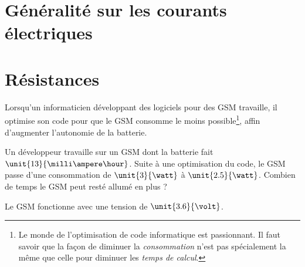 

\section{Généralité sur les courants électriques}

\section{Résistances}

\begin{exercice}
	Lorsqu'un informaticien développant des logiciels pour des GSM travaille, il optimise son code pour que le GSM consomme le moins possible\footnote{Le monde de l'optimisation de code informatique est passionnant. Il faut savoir que la façon de diminuer la \emph{consommation} n'est pas spécialement la même que celle pour diminuer les \emph{temps de calcul}.}, affin d'augmenter l'autonomie de la batterie.
	
	Un développeur travaille sur un GSM dont la batterie fait $\unit{13}{\milli\ampere\hour}$. Suite à une optimisation du code, le GSM passe d'une consommation de $\unit{3}{\watt}$ à $\unit{2.5}{\watt}$. Combien de temps le GSM peut resté allumé en plus ?
	
	Le GSM fonctionne avec une tension de $\unit{3.6}{\volt}$.
\end{exercice}



